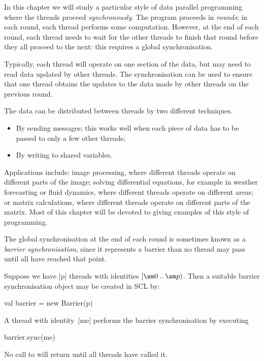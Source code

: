 In this chapter we will study a particular style of data parallel programming
where the threads proceed \emph{synchronously}.  The program proceeds in
\emph{rounds}; in each round, each thread performs some computation.  However,
at the end of each round, each thread needs to wait for the other threads to
finish that round before they all proceed to the next: this requires a global
synchronisation.


Typically, each thread will operate on one section of the data, but  may
need to read data updated by other threads.  The synchronisation can be used
to ensure that one thread obtains the updates to the data made by other
threads on the previous round.

The data can be distributed between threads by two different techniques.
%
\begin{itemize}
\item
By sending messages; this works well when each piece of data has to be
passed to only a few other threads;

\item
By writing to shared variables.
\end{itemize}



Applications include: image processing, where different threads operate on
different parts of the image; solving differential equations, for example in
weather forecasting or fluid dynamics, where different threads operate on
different areas; or matrix calculations, where different threads operate on
different parts of the matrix.  Most of this chapter will be devoted to giving
examples of this style of programming. 


The global synchronisation at the end of each round is sometimes known as a
\emph{barrier synchronisation}, since it represents a barrier than no thread
may pass until all have reached that point.

Suppose we have |p| threads with identities $\interval{\sm 0}{\sm p}$.  Then a
suitable barrier synchronisation object may be created in SCL by:
%
\begin{scala}
  val barrier = new Barrier(p)
\end{scala}
%
A thread with identity~|me| performs the barrier synchronisation by executing%
%
\begin{scala}
  barrier.sync(me)
\end{scala}
%
No call to  will return until all  threads have called
it. 

